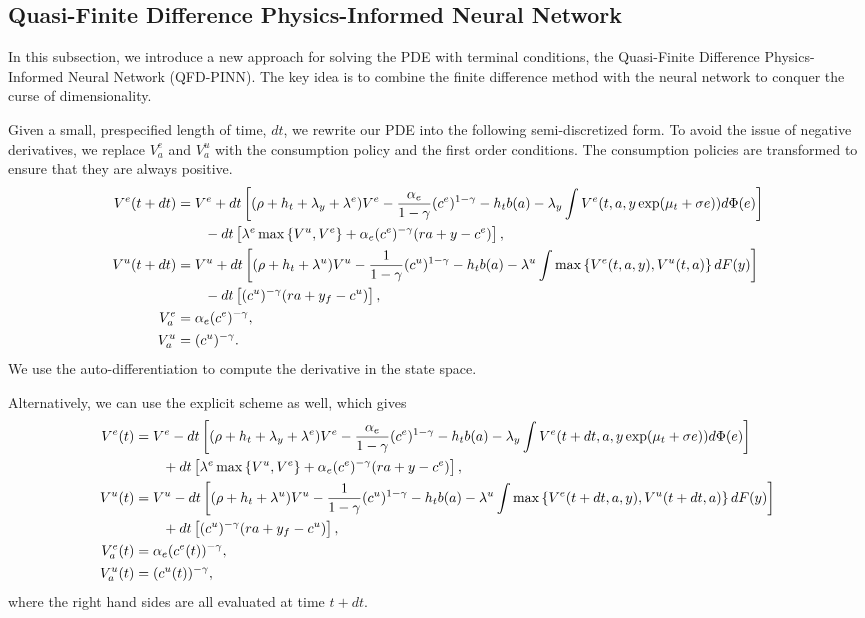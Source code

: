 \documentclass[a4paper, 12pt]{article}
\begin{document}
\subsection{Quasi-Finite Difference Physics-Informed Neural Network}
In this subsection, we introduce a new approach for solving the PDE with terminal 
conditions, the Quasi-Finite Difference Physics-Informed Neural Network (QFD-PINN). 
The key idea is to combine the finite difference method with the neural network to 
conquer the curse of dimensionality. 

Given a small, prespecified length of time, $dt$, we rewrite our PDE into the following 
semi-discretized form. To avoid the issue of negative derivatives, we replace $V^e_a$ 
and $V^u_a$ with the consumption policy and the first order conditions. The 
consumption policies are transformed to ensure that they are always positive. 
\begin{align}
    V^e(t+dt) &= V^e + dt\sbrc{(\rho + h_t + \lambda_y + \lambda^e)V^e - \frac{\alpha_e}{1-\gamma}(c^e)^{1 - \gamma} - h_tb(a) - \lambda_y\int V^e(t,a,y\exp(\mu_t + \sigma e))d\Phi(e)} \nonumber \\
    &\qquad - dt\sbrc{\lambda^e\max\set{V^u, V^e} + \alpha_e(c^e)^{-\gamma}\pth{ra + y - c^e}}, \label{eq:implicit_qfd_e}\\
    V^u(t+dt) &= V^u + dt\sbrc{(\rho + h_t + \lambda^u)V^u - \frac{1}{1-\gamma}(c^u)^{1 - \gamma} - h_tb(a) - \lambda^u\int \max\set{V^e(t,a,y), V^u(t,a)}dF(y)} \nonumber \\
    &\qquad - dt\sbrc{(c^u)^{-\gamma}\pth{ra + y_f - c^u}}, \label{eq:implicit_qfd_u} \\
    V_a^e &= \alpha_e (c^e)^{-\gamma}, \label{eq:implicit_foc_e} \\ 
    V_a^u &= (c^u)^{-\gamma}. \label{eq:implicit_foc_u} 
\end{align}
We use the auto-differentiation to compute the derivative in the state space. 

Alternatively, we can use the explicit scheme as well, which gives 
\begin{align}
    V^e(t) &= V^e - dt\sbrc{(\rho + h_t + \lambda_y + \lambda^e)V^e - \frac{\alpha_e}{1-\gamma}(c^e)^{1 - \gamma} - h_tb(a) - \lambda_y\int V^e(t+dt,a,y\exp(\mu_t + \sigma e))d\Phi(e)} \nonumber \\
    &\qquad + dt\sbrc{\lambda^e\max\set{V^u, V^e} + \alpha_e(c^e)^{-\gamma}\pth{ra + y - c^e}}, \label{eq:explicit_qfd_e}\\
    V^u(t) &= V^u - dt\sbrc{(\rho + h_t + \lambda^u)V^u - \frac{1}{1-\gamma}(c^u)^{1 - \gamma} - h_tb(a) - \lambda^u\int \max\set{V^e(t+dt,a,y), V^u(t+dt,a)}dF(y)} \nonumber \\
    &\qquad + dt\sbrc{(c^u)^{-\gamma}\pth{ra + y_f - c^u}}, \label{eq:explicit_qfd_u} \\
    V_a^e(t) &= \alpha_e (c^e(t))^{-\gamma}, \label{eq:explicit_foc_e} \\ 
    V_a^u(t) &= (c^u(t))^{-\gamma}, \label{eq:explicit_foc_u} 
\end{align}
where the right hand sides are all evaluated at time $t+dt$.



\end{document}
